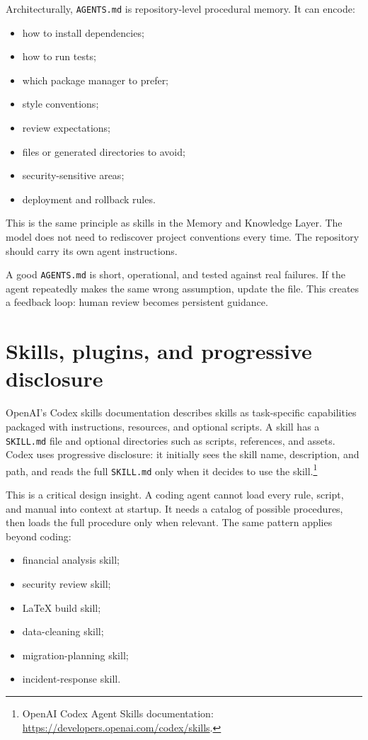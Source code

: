 Architecturally, \texttt{AGENTS.md} is repository-level procedural memory. It can encode:

\begin{itemize}[leftmargin=*]
  \item how to install dependencies;
  \item how to run tests;
  \item which package manager to prefer;
  \item style conventions;
  \item review expectations;
  \item files or generated directories to avoid;
  \item security-sensitive areas;
  \item deployment and rollback rules.
\end{itemize}

This is the same principle as skills in the Memory and Knowledge Layer. The model does not need to rediscover project conventions every time. The repository should carry its own agent instructions.

A good \texttt{AGENTS.md} is short, operational, and tested against real failures. If the agent repeatedly makes the same wrong assumption, update the file. This creates a feedback loop: human review becomes persistent guidance.

\section{Skills, plugins, and progressive disclosure}

OpenAI's Codex skills documentation describes skills as task-specific capabilities packaged with instructions, resources, and optional scripts. A skill has a \texttt{SKILL.md} file and optional directories such as scripts, references, and assets. Codex uses progressive disclosure: it initially sees the skill name, description, and path, and reads the full \texttt{SKILL.md} only when it decides to use the skill.\footnote{OpenAI Codex Agent Skills documentation: \url{https://developers.openai.com/codex/skills}.}

This is a critical design insight. A coding agent cannot load every rule, script, and manual into context at startup. It needs a catalog of possible procedures, then loads the full procedure only when relevant. The same pattern applies beyond coding:

\begin{itemize}[leftmargin=*]
  \item financial analysis skill;
  \item security review skill;
  \item LaTeX build skill;
  \item data-cleaning skill;
  \item migration-planning skill;
  \item incident-response skill.
\end{itemize}

